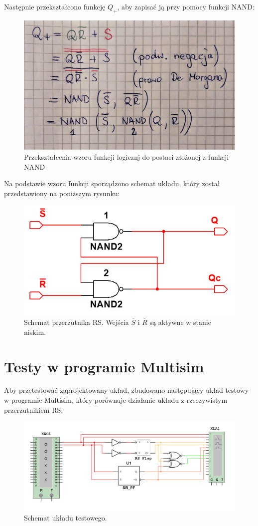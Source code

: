 \documentclass[12pt,a4paper,openright]{mwrep}
\begin{document}
Następnie przekształcono funkcję $Q_+$, aby zapisać ją przy pomocy funkcji NAND:

\begin{figure}[H]
    \centering
    \includegraphics[width=0.6\linewidth]{images/rs_derivation.jpg}
    \caption{Przekształcenia wzoru funkcji logicznj do postaci złożonej z funkcji NAND}
    \label{fig:rs_derivation}
\end{figure}

Na podstawie wzoru funkcji sporządzono schemat układu, który został przedstawiony na poniższym rysunku:

\begin{figure}[H]
    \centering
    \includegraphics[width=0.5\linewidth]{images/rs_schematic.PNG}
    \caption{Schemat przerzutnika RS. Wejścia $\overline{S}$ i $\overline{R}$ są aktywne w stanie niskim.}
    \label{fig:rs_schematic}
\end{figure}

\section{Testy w programie Multisim}

Aby przetestować zaprojektowany układ, zbudowano następujący układ testowy w programie Multisim, 
który porównuje działanie układu z rzeczywistym przerzutnikiem RS:

\begin{figure}[H]
    \centering
    \includegraphics[width=0.9\linewidth]{images/rs_test.PNG}
    \caption{Schemat układu testowego.}
    \label{fig:rs_test}
\end{figure}
\end{document}
